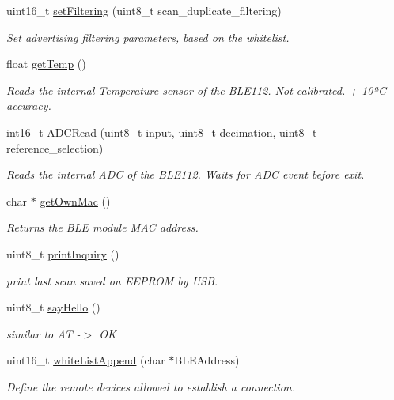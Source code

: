 \begin{DoxyCompactItemize}
uint16\+\_\+t \hyperlink{class_wasp_b_l_e_a323d352a336d3559106a4ea72ac82358}{set\+Filtering} (uint8\+\_\+t scan\+\_\+duplicate\+\_\+filtering)
\begin{DoxyCompactList}\small\item\em Set advertising filtering parameters, based on the whitelist. \end{DoxyCompactList}\item 
float \hyperlink{class_wasp_b_l_e_ad0a86810bcd73ac2549a85bb549594ed}{get\+Temp} ()
\begin{DoxyCompactList}\small\item\em Reads the internal Temperature sensor of the B\+L\+E112. Not calibrated. +-\/10ªC accuracy. \end{DoxyCompactList}\item 
int16\+\_\+t \hyperlink{class_wasp_b_l_e_ac958c81fa78a6f7fe78647c48cfd223a}{A\+D\+C\+Read} (uint8\+\_\+t input, uint8\+\_\+t decimation, uint8\+\_\+t reference\+\_\+selection)
\begin{DoxyCompactList}\small\item\em Reads the internal A\+DC of the B\+L\+E112. Waits for A\+DC event before exit. \end{DoxyCompactList}\item 
char $\ast$ \hyperlink{class_wasp_b_l_e_ade17474622ee87dd8b26e5583ba984d4}{get\+Own\+Mac} ()
\begin{DoxyCompactList}\small\item\em Returns the B\+LE module M\+AC address. \end{DoxyCompactList}\item 
uint8\+\_\+t \hyperlink{class_wasp_b_l_e_af86975d3c407e3cead279eb0328b4e23}{print\+Inquiry} ()
\begin{DoxyCompactList}\small\item\em print last scan saved on E\+E\+P\+R\+OM by U\+SB. \end{DoxyCompactList}\item 
uint8\+\_\+t \hyperlink{class_wasp_b_l_e_ae4db5ca2f4c6cb92fd87c5984e2b7184}{say\+Hello} ()
\begin{DoxyCompactList}\small\item\em similar to AT -\/$>$ OK \end{DoxyCompactList}\item 
uint16\+\_\+t \hyperlink{class_wasp_b_l_e_a14956d02528234516d4f86b0f59c0147}{white\+List\+Append} (char $\ast$B\+L\+E\+Address)
\begin{DoxyCompactList}\small\item\em Define the remote devices allowed to establish a connection. \end{DoxyCompactList}\item 

\end{DoxyCompactItemize}
